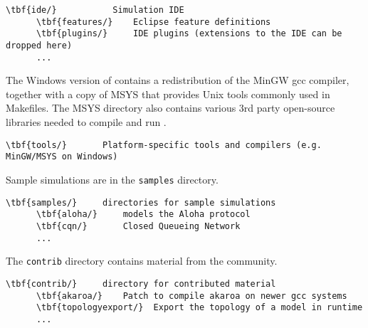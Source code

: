 \begin{Verbatim}[commandchars=\\\{\}]
    \tbf{ide/}           Simulation IDE
      \tbf{features/}    Eclipse feature definitions
      \tbf{plugins/}     IDE plugins (extensions to the IDE can be dropped here)
      ...
\end{Verbatim}

The Windows version of {\opp} contains a redistribution of the MinGW
gcc compiler, together with a copy of MSYS that provides Unix tools
commonly used in Makefiles. The MSYS directory also contains various
3rd party open-source libraries needed to compile and run {\opp}.

\begin{Verbatim}[commandchars=\\\{\}]
    \tbf{tools/}       Platform-specific tools and compilers (e.g. MinGW/MSYS on Windows)
\end{Verbatim}

Sample simulations are in the \texttt{samples} directory.

\begin{Verbatim}[commandchars=\\\{\}]
    \tbf{samples/}     directories for sample simulations
      \tbf{aloha/}     models the Aloha protocol
      \tbf{cqn/}       Closed Queueing Network
      ...
\end{Verbatim}

The \texttt{contrib} directory contains material from the {\opp} community.

\begin{Verbatim}[commandchars=\\\{\}]
    \tbf{contrib/}     directory for contributed material
      \tbf{akaroa/}    Patch to compile akaroa on newer gcc systems
      \tbf{topologyexport/}  Export the topology of a model in runtime
      ...
\end{Verbatim}



